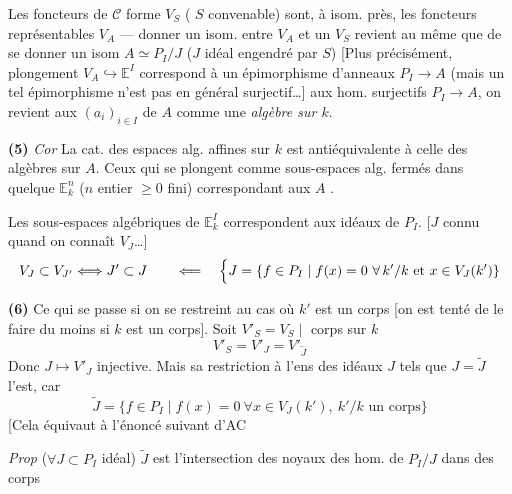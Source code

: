 \documentclass[11pt,a4paper]{article}
\begin{document}
\struck{\ill{}} Les foncteurs de $\mathcal{C}$ \ill{} forme $V_S$ (\ill{} $S$ convenable) sont, à isom. près, les foncteurs représentables $V_A$ --- donner un isom. entre $V_A$ et un $V_S$ \struck{\ill{}} revient au même que de se donner un isom $A \simeq P_I / J$ ($J$ idéal engendré par $S$)  [Plus précisément, \ill{} plongement $V_A \hookrightarrow \mathbb{E}^I$ correspond à un épimorphisme d'anneaux $P_I \to A$ (mais un tel épimorphisme n'est pas en général surjectif…]  aux hom. surjectifs $P_I \to A$, on revient aux  $(a_i)_{i \in I}$ de $A$ comme une \emph{algèbre sur $k$}.

\textbf{(5)} \emph{Cor} La cat. des espaces alg. affines sur $k$ est antiéquivalente à celle des algèbres sur $A$. Ceux qui se plongent comme sous-espaces alg. fermés dans quelque $\mathbb{E}^n_k$ ($n$ entier $\geqslant 0$ fini)  correspondant aux $A$  .

Les \struck{\ill{}} sous-espaces algébriques de $\mathbb{E}^I_k$ correspondent aux idéaux de $P_I$. \struck{\ill{}} [$J$ connu quand on connaît $V_J$…]
\[
V_J \subset V_{J'} \Longleftrightarrow J' \subset J
\qquad \Longleftarrow \quad
\Bigl\{ J = \{ f \in P_I \mid f(x) = 0 \ \forall\, k'/k \text{ et } x \in V_J(k') \} \Bigr.
\]

\textbf{(6)} Ce qui se passe si on se restreint au cas où $k'$ est un corps [on est tenté de le faire du moins si $k$ est un corps]. \struck{\ill{}} Soit $V'_S = V_S \mid$ corps sur $k$
\[
V'_{S} = V'_{J} = V'_{\widetilde{J}}
\]
Donc $J \mapsto V'_J$  injective. Mais sa restriction à l'ens des idéaux $J$ tels que $J = \widetilde{J}$ l'est, car
\[
\widetilde{J} = \{ f \in P_I \mid f(x) = 0 \ \forall x \in V_J(k'),\ k'/k \text{ un corps} \}
\]
[Cela  équivaut à l'énoncé suivant d'AC

\emph{Prop} ($\forall J \subset P_I$ idéal) $\widetilde{J}$ est l'intersection des noyaux des hom. de $P_I / J$ dans des corps
\end{document}

